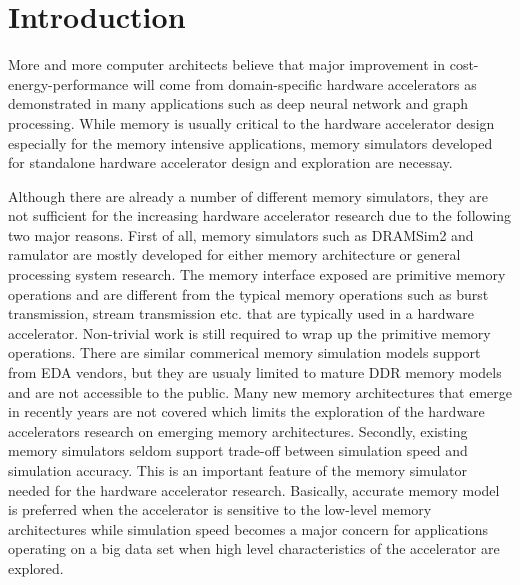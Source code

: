 \section{Introduction}
More and more computer architects believe that major improvement in cost-energy-performance will come from domain-specific hardware accelerators as demonstrated in many applications such as deep neural network and graph processing. While memory is usually critical to the hardware accelerator design especially for the memory intensive applications, memory simulators developed for standalone hardware accelerator design and exploration are necessay. 

Although there are already a number of different memory simulators, they are not sufficient for the increasing hardware accelerator research due to the following two major reasons. First of all, memory simulators such as DRAMSim2 and ramulator are mostly developed for either memory architecture or general processing system research. The memory interface exposed are primitive memory operations and are different from the typical memory operations such as burst transmission, stream transmission etc. that are typically used in a hardware accelerator. Non-trivial work is still required to wrap up the primitive memory operations. There are similar commerical memory simulation models support from EDA vendors, but they are usualy limited to mature DDR memory models and are not accessible to the public. Many new memory architectures that emerge in recently years are not covered which limits the exploration of the hardware accelerators research on emerging memory architectures. Secondly, existing memory simulators seldom support trade-off between simulation speed and simulation accuracy. This is an important feature of the memory simulator needed for the hardware accelerator research. Basically, accurate memory model is preferred when the accelerator is sensitive to the low-level memory architectures while simulation speed becomes a major concern for applications operating on a big data set when high level characteristics of the accelerator are explored. 


